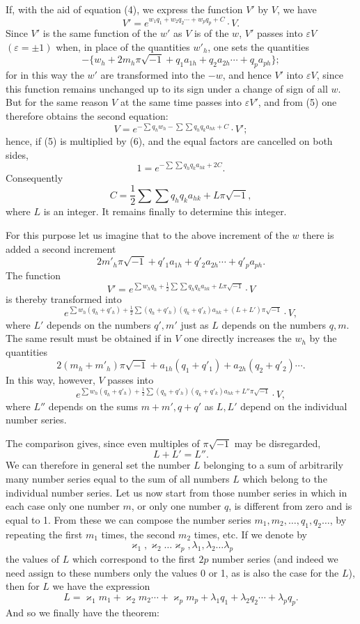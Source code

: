 \documentclass[10pt]{article}
\begin{document}
If, with the aid of equation (4), we express the function \(V'\) by \(V\), we have
\[
\tag{5}V'=e^{w_1q_1+w_2q_2\cdots+w_pq_p+C}\cdot V.
\]
Since \(V'\) is the same function of the \(w'\) as \(V\) is of the \(w\), \(V'\) passes into \(\varepsilon V\) \((\varepsilon=\pm1)\) when, in place of the quantities \(w'_h\), one sets the quantities
\[
-\{w_h+2m_h\pi\sqrt{-1}+q_1a_{1h}+q_2a_{2h}\cdots+q_pa_{ph}\};
\]
for in this way the \(w'\) are transformed into the \(-w\), and hence \(V'\) into \(\varepsilon V\), since this function remains unchanged up to its sign under a change of sign of all \(w\). But for the same reason \(V\) at the same time passes into \(\varepsilon V'\), and from (5) one therefore obtains the second equation:
\[
\tag{6}V=e^{-\sum q_hw_h-\sum\sum q_hq_ka_{hk}+C}\cdot V';
\]
hence, if (5) is multiplied by (6), and the equal factors are cancelled on both sides,
\[
1=e^{-\sum\sum q_hq_ka_{hk}+2C}.
\]
Consequently
\[
\tag{7}C=\frac12\sum\sum q_hq_ka_{hk}+L\pi\sqrt{-1},
\]
where \(L\) is an integer. It remains finally to determine this integer.

For this purpose let us imagine that to the above increment of the \(w\) there is added a second increment
\[
2m'_h\pi\sqrt{-1}+q'_1a_{1h}+q'_2a_{2h}\cdots+q'_pa_{ph}.
\]
The function
\[
V'=e^{\sum w_hq_h+\frac12\sum\sum q_hq_ka_{hk}+L\pi\sqrt{-1}}\cdot V
\]
is thereby transformed into
\[
e^{\sum w_h(q_h+q'_h)+\frac12\sum(q_h+q'_h)(q_k+q'_k)a_{hk}+(L+L')\pi\sqrt{-1}}\cdot V,
\]
where \(L'\) depends on the numbers \(q',m'\) just as \(L\) depends on the numbers \(q,m\). The same result must be obtained if in \(V\) one directly increases the \(w_h\) by the quantities
\[
2(m_h+m'_h)\pi\sqrt{-1}+a_{1h}(q_1+q'_1)+a_{2h}(q_2+q'_2)\cdots.
\]
In this way, however, \(V\) passes into
\[
e^{\sum w_h(q_h+q'_h)+\frac12\sum(q_h+q'_h)(q_k+q'_k)a_{hk}+L''\pi\sqrt{-1}}\cdot V,
\]
where \(L''\) depends on the sums \(m+m',q+q'\) as \(L,L'\) depend on the individual number series.

The comparison gives, since even multiples of \(\pi\sqrt{-1}\) may be disregarded,
\[
L+L'=L''.
\]
We can therefore in general set the number \(L\) belonging to a sum of arbitrarily many number series equal to the sum of all numbers \(L\) which belong to the individual number series. Let us now start from those number series in which in each case only one number \(m\), or only one number \(q\), is different from zero and is equal to 1. From these we can compose the number series \(m_1,m_2,
\ldots,q_1,q_2\ldots\), by repeating the first \(m_1\) times, the second \(m_2\) times, etc. If we denote by
\[
\varkappa_1,\varkappa_2\ldots\varkappa_p,\lambda_1,\lambda_2\ldots\lambda_p
\]
the values of \(L\) which correspond to the first \(2p\) number series (and indeed we need assign to these numbers only the values 0 or 1, as is also the case for the \(L\)), then for \(L\) we have the expression
\[
L=\varkappa_1m_1+\varkappa_2m_2\cdots+\varkappa_pm_p+\lambda_1q_1+\lambda_2q_2\cdots+\lambda_pq_p.
\]
And so we finally have the theorem:
\end{document}
